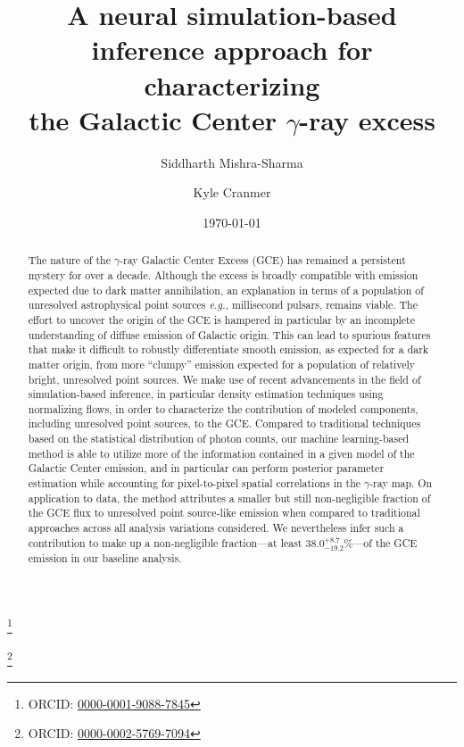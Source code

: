 \documentclass[prd,aps,10pt,nofootinbib,twocolumn,superscriptaddress,preprintnumbers,balancelastpage,longbibliography]{revtex4-1}
\begin{document}

\title{A neural simulation-based inference approach for characterizing \\ the Galactic Center $\gamma$-ray excess}

\author{Siddharth Mishra-Sharma}
\thanks{ORCID: \href{https://orcid.org/0000-0001-9088-7845}{0000-0001-9088-7845}}

\author{Kyle Cranmer}
\thanks{ORCID: \href{https://orcid.org/0000-0002-5769-7094}{0000-0002-5769-7094}}

\date{\today}

\begin{abstract}
The nature of the \Fermi $\gamma$-ray Galactic Center Excess (GCE) has remained a persistent mystery for over a decade. Although the excess is broadly compatible with emission expected due to dark matter annihilation, an explanation in terms of a population of unresolved astrophysical point sources \emph{e.g.}, millisecond pulsars, remains viable. The effort to uncover the origin of the GCE is hampered in particular by an incomplete understanding of diffuse emission of Galactic origin. This can lead to spurious features that make it difficult to robustly differentiate smooth emission, as expected for a dark matter origin, from more ``clumpy'' emission expected for a population of relatively bright, unresolved point sources. We make use of recent advancements in the field of simulation-based inference, in particular density estimation techniques using normalizing flows, in order to characterize the contribution of modeled components, including unresolved point sources, to the GCE. Compared to traditional techniques based on the statistical distribution of photon counts, our machine learning-based method is able to utilize more of the information contained in a given model of the Galactic Center emission, and in particular can perform posterior parameter estimation while accounting for pixel-to-pixel spatial correlations in the $\gamma$-ray map. On application to \Fermi data, the method attributes a smaller but still non-negligible fraction of the GCE flux to unresolved point source-like emission when compared to traditional approaches across all analysis variations considered. We nevertheless infer such a contribution to make up a non-negligible fraction---at least $38.0^{+8.7}_{-19.2}\%$---of the GCE emission in our baseline analysis.
\end{abstract}
\end{document}
